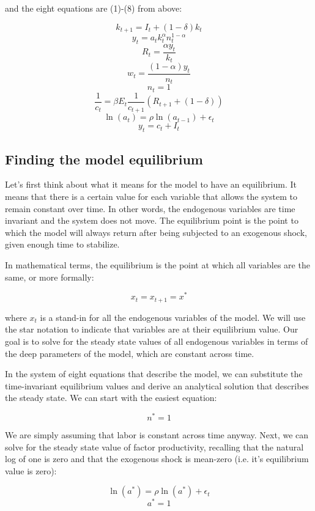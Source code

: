 \documentclass[12pt]{article}
\begin{document}
and the eight equations are (1)-(8) from above:

\[ k_{t+1} = I_t + (1-\delta) k_t \]
\[ y_t = a_t k_t^{\alpha} n_t^{1-\alpha} \]
\[ R_t = \frac{\alpha y_t}{k_t} \]
\[ w_t = \frac{(1-\alpha) y_t}{n_t} \]
\[ n_t = 1 \]
\[ \frac{1}{c_t} = \beta E_t \frac{1}{c_{t+1}}(R_{t+1} + (1-\delta)) \]
\[ \ln(a_t) = \rho \ln(a_{t-1}) + \epsilon_t \]
\[ y_t = c_t + I_t \]

\subsection{Finding the model equilibrium}

Let's first think about what it means for the model to have an equilibrium. It means that there is a certain value for each variable that allows the system to remain constant over time. In other words, the endogenous variables are time invariant and the system does not move. The equilibrium point is the point to which the model will always return after being subjected to an exogenous shock, given enough time to stabilize. 

In mathematical terms, the equilibrium is the point at which all variables are the same, or more formally:

\[ x_t = x_{t+1} = x^* \]

where \(x_t\) is a stand-in for all the endogenous variables of the model. We will use the star notation to indicate that variables are at their equilibrium value. Our goal is to solve for the steady state values of all endogenous variables in terms of the deep parameters of the model, which are constant across time.

In the system of eight equations that describe the model, we can substitute the time-invariant equilibrium values and derive an analytical solution that describes the steady state. We can start with the easiest equation:

\begin{equation}
n^* = 1
\end{equation} 

We are simply assuming that labor is constant across time anyway. Next, we can solve for the steady state value of factor productivity, recalling that the natural log of one is zero and that the exogenous shock is mean-zero (i.e. it's equilibrium value is zero):

\[ \ln(a^*) = \rho \ln(a^*) + \epsilon_t \]
\begin{equation}
a^* = 1
\end{equation}
\end{document}
